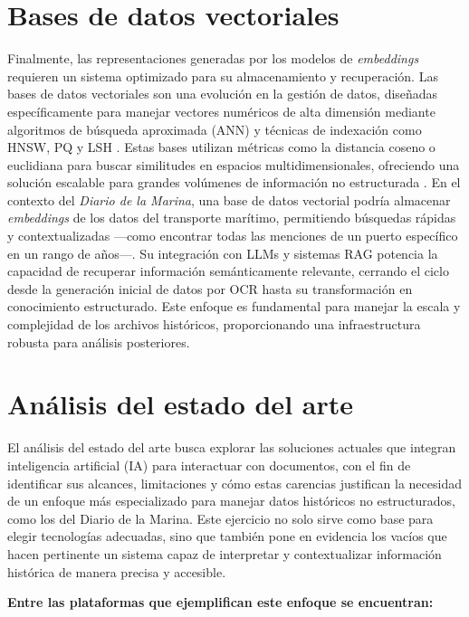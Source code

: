 \section{Bases de datos vectoriales}\label{seq_6}

Finalmente, las representaciones generadas por los modelos de \textit{embeddings} requieren un sistema optimizado para su almacenamiento y recuperación. Las bases de datos vectoriales son una evolución en la gestión de datos, diseñadas específicamente para manejar vectores numéricos de alta dimensión mediante algoritmos de búsqueda aproximada (ANN) y técnicas de indexación como HNSW, PQ y LSH \cite{xie2023brief, han2023comprehensive}. Estas bases utilizan métricas como la distancia coseno o euclidiana para buscar similitudes en espacios multidimensionales, ofreciendo una solución escalable para grandes volúmenes de información no estructurada \cite{azizi2024vector, sun2024soar}.
En el contexto del \textit{Diario de la Marina}, una base de datos vectorial podría almacenar \textit{embeddings} de los datos del transporte marítimo, permitiendo búsquedas rápidas y contextualizadas —como encontrar todas las menciones de un puerto específico en un rango de años—. Su integración con LLMs y sistemas RAG potencia la capacidad de recuperar información semánticamente relevante, cerrando el ciclo desde la generación inicial de datos por OCR hasta su transformación en conocimiento estructurado. Este enfoque es fundamental para manejar la escala y complejidad de los archivos históricos, proporcionando una infraestructura robusta para análisis posteriores.


\section{Análisis del estado del arte}
El análisis del estado del arte busca explorar las soluciones actuales que integran inteligencia artificial (IA) para interactuar con documentos, con el fin de identificar sus alcances, limitaciones y cómo estas carencias justifican la necesidad de un enfoque más especializado para manejar datos históricos no estructurados, como los del Diario de la Marina. Este ejercicio no solo sirve como base para elegir tecnologías adecuadas, sino que también pone en evidencia los vacíos que hacen pertinente un sistema capaz de interpretar y contextualizar información histórica de manera precisa y accesible.

\textbf{Entre las plataformas que ejemplifican este enfoque se encuentran:}

